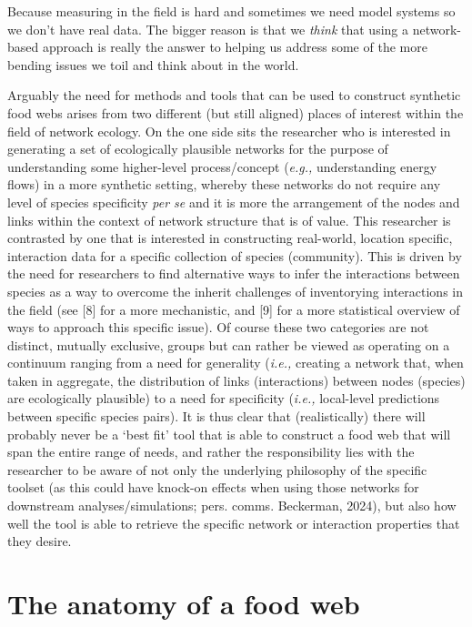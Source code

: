 \documentclass[
]{article}
\begin{document}
Because measuring in the field is hard and sometimes we need model
systems so we don't have real data. The bigger reason is that we
\emph{think} that using a network-based approach is really the answer to
helping us address some of the more bending issues we toil and think
about in the world.

Arguably the need for methods and tools that can be used to construct
synthetic food webs arises from two different (but still aligned) places
of interest within the field of network ecology. On the one side sits
the researcher who is interested in generating a set of ecologically
plausible networks for the purpose of understanding some higher-level
process/concept (\emph{e.g.,} understanding energy flows) in a more
synthetic setting, whereby these networks do not require any level of
species specificity \emph{per se} and it is more the arrangement of the
nodes and links within the context of network structure that is of
value. This researcher is contrasted by one that is interested in
constructing real-world, location specific, interaction data for a
specific collection of species (community). This is driven by the need
for researchers to find alternative ways to infer the interactions
between species as a way to overcome the inherit challenges of
inventorying interactions in the field (see {[}8{]} for a more
mechanistic, and {[}9{]} for a more statistical overview of ways to
approach this specific issue). Of course these two categories are not
distinct, mutually exclusive, groups but can rather be viewed as
operating on a continuum ranging from a need for generality
(\emph{i.e.,} creating a network that, when taken in aggregate, the
distribution of links (interactions) between nodes (species) are
ecologically plausible) to a need for specificity (\emph{i.e.,}
local-level predictions between specific species pairs). It is thus
clear that (realistically) there will probably never be a `best fit'
tool that is able to construct a food web that will span the entire
range of needs, and rather the responsibility lies with the researcher
to be aware of not only the underlying philosophy of the specific
toolset (as this could have knock-on effects when using those networks
for downstream analyses/simulations; pers. comms. Beckerman, 2024), but
also how well the tool is able to retrieve the specific network or
interaction properties that they desire.

\section{The anatomy of a food web}\label{sec-network-anatomy}
\end{document}
